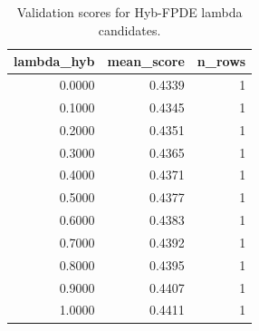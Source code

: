 \begin{table}[t]
\caption{Validation scores for Hyb-FPDE lambda candidates.}
\label{tab:lambda_distribution_computed}
\centering
\begin{tabular}{rrr}
\toprule
lambda\_hyb & mean\_score & n\_rows \\
\midrule
0.0000 & 0.4339 & 1 \\
0.1000 & 0.4345 & 1 \\
0.2000 & 0.4351 & 1 \\
0.3000 & 0.4365 & 1 \\
0.4000 & 0.4371 & 1 \\
0.5000 & 0.4377 & 1 \\
0.6000 & 0.4383 & 1 \\
0.7000 & 0.4392 & 1 \\
0.8000 & 0.4395 & 1 \\
0.9000 & 0.4407 & 1 \\
1.0000 & 0.4411 & 1 \\
\bottomrule
\end{tabular}

\end{table}
